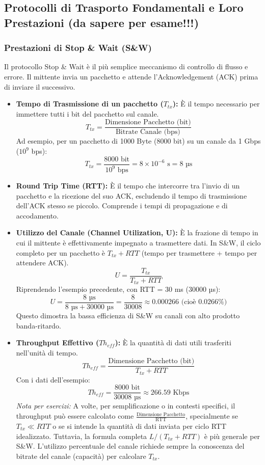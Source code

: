 \subsection{Protocolli di Trasporto Fondamentali e Loro Prestazioni (da sapere per esame!!!)}
\subsubsection{Prestazioni di Stop \& Wait (S\&W)}
Il protocollo Stop \& Wait è il più semplice meccanismo di controllo di flusso e errore. Il mittente invia un pacchetto e attende l'Acknowledgement (ACK) prima di inviare il successivo.

\begin{itemize}
    \item \textbf{Tempo di Trasmissione di un pacchetto ($T_{tx}$):} È il tempo necessario per immettere tutti i bit del pacchetto sul canale.
        \[ T_{tx} = \frac{\text{Dimensione Pacchetto (bit)}}{\text{Bitrate Canale (bps)}} \]
        Ad esempio, per un pacchetto di 1000 Byte (8000 bit) su un canale da 1 Gbps ($10^9$ bps):
        \[ T_{tx} = \frac{8000 \text{ bit}}{10^9 \text{ bps}} = 8 \times 10^{-6} \text{ s} = 8 \text{ µs} \]

    \item \textbf{Round Trip Time (RTT):} È il tempo che intercorre tra l'invio di un pacchetto e la ricezione del suo ACK, escludendo il tempo di trasmissione dell'ACK stesso se piccolo. Comprende i tempi di propagazione e di accodamento.

    \item \textbf{Utilizzo del Canale (Channel Utilization, U):} È la frazione di tempo in cui il mittente è effettivamente impegnato a trasmettere dati. In S\&W, il ciclo completo per un pacchetto è $T_{tx} + RTT$ (tempo per trasmettere + tempo per attendere ACK).
        \[ U = \frac{T_{tx}}{T_{tx} + RTT} \]
        Riprendendo l'esempio precedente, con RTT = 30 ms (30000 µs):
        \[ U = \frac{8 \text{ µs}}{8 \text{ µs} + 30000 \text{ µs}} = \frac{8}{30008} \approx 0.000266 \text{ (cioè 0.0266\%)} \]
        Questo dimostra la bassa efficienza di S\&W su canali con alto prodotto banda-ritardo.

    \item \textbf{Throughput Effettivo ($Th_{eff}$):} È la quantità di dati utili trasferiti nell'unità di tempo.
        \[ Th_{eff} = \frac{\text{Dimensione Pacchetto (bit)}}{T_{tx} + RTT} \]
        Con i dati dell'esempio:
        \[ Th_{eff} = \frac{8000 \text{ bit}}{30008 \text{ µs}} \approx 266.59 \text{ Kbps} \]
        \textit{Nota per esercizi:} A volte, per semplificazione o in contesti specifici, il throughput può essere calcolato come $\frac{\text{Dimensione Pacchetto}}{\text{RTT}}$, specialmente se $T_{tx} \ll RTT$ o se si intende la quantità di dati inviata per ciclo RTT idealizzato. Tuttavia, la formula completa $L/(T_{tx}+RTT)$ è più generale per S\&W. L'utilizzo percentuale del canale richiede sempre la conoscenza del bitrate del canale (capacità) per calcolare $T_{tx}$.
\end{itemize}

